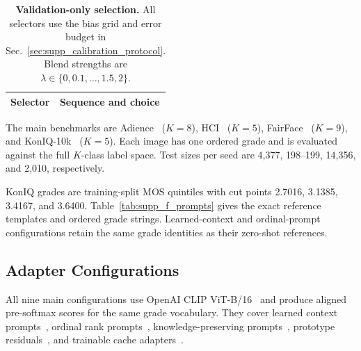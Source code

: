 \begin{table}[!t]
\centering
\caption{\textbf{Target-grade support allocations.}
(a) Pre-mask quotas and per-target counts at 0/10/20\% support.
Fixed-total has 256 images on all four tasks.
(b) Fixed-seen totals on Adience and HCI.}
\label{tab:supp_f_support}
\begingroup
\fontsize{8}{9.5}\selectfont
\setlength{\tabcolsep}{3pt}
\renewcommand{\arraystretch}{1}

\endgroup
\end{table}

\begin{table}[!t]
\centering
\caption{\textbf{Validation-only selection.}
All selectors use the bias grid and error budget in Sec.~\ref{sec:supp_calibration_protocol}.
Blend strengths are $\lambda\in\{0,0.1,\ldots,1.5,2\}$.}
\label{tab:supp_f_selectors}
\begingroup
\fontsize{8}{9.5}\selectfont
\setlength{\tabcolsep}{3pt}
\renewcommand{\arraystretch}{1}
\begin{tabularx}{\columnwidth}{
  @{}
  >{\raggedright\arraybackslash}p{}
  >{\raggedright\arraybackslash}X
  @{}
}
\toprule
Selector & Sequence and choice\\
\midrule

\end{tabularx}
\endgroup
\end{table}

The main benchmarks are Adience~\cite{eidinger2014age} ($K=8$), HCI~\cite{palermo2012dating} ($K=5$), FairFace~\cite{karkkainen2021fairface} ($K=9$), and KonIQ-10k~\cite{hosu2020koniq} ($K=5$).
Each image has one ordered grade and is evaluated against the full $K$-class label space.
Test sizes per seed are 4,377, 198--199, 14,356, and 2,010, respectively.

KonIQ grades are training-split MOS quintiles with cut points 2.7016, 3.1385, 3.4167, and 3.6400.
Table~\ref{tab:supp_f_prompts} gives the exact reference templates and ordered grade strings.
Learned-context and ordinal-prompt configurations retain the same grade identities as their zero-shot references.


\subsection{Adapter Configurations}
\label{sec:supp_adapters}

All nine main configurations use OpenAI CLIP ViT-B/16~\cite{radford2021clip} and produce aligned pre-softmax scores for the same grade vocabulary.
They cover learned context prompts~\cite{zhou2022coop}, ordinal rank prompts~\cite{li2022ordinalclip}, knowledge-preserving prompts~\cite{yao2023kgcoop}, prototype residuals~\cite{yu2023taskres}, and trainable cache adapters~\cite{zhang2022tipadapter}.



